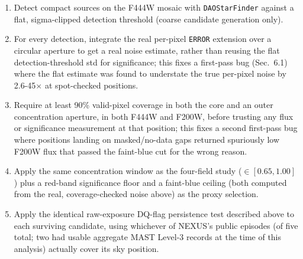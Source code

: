 \documentclass[11pt]{article}
\begin{document}
\begin{enumerate}
    \item Detect compact sources on the F444W mosaic with \texttt{DAOStarFinder}
    against a flat, sigma-clipped detection threshold (coarse candidate
    generation only).
    \item For every detection, integrate the real per-pixel \texttt{ERROR}
    extension over a circular aperture to get a real noise estimate, rather
    than reusing the flat detection-threshold std for significance; this fixes
    a first-pass bug (Sec.~6.1) where the flat estimate was found to
    understate the true per-pixel noise by 2.6-45$\times$ at spot-checked
    positions.
    \item Require at least 90\% valid-pixel coverage in both the core and an
    outer concentration aperture, in both F444W and F200W, before trusting any
    flux or significance measurement at that position; this fixes a second
    first-pass bug where positions landing on masked/no-data gaps returned
    spuriously low F200W flux that passed the faint-blue cut for the wrong
    reason.
    \item Apply the same concentration window as the four-field study
    ($\in[0.65,1.00]$) plus a red-band significance floor and a faint-blue
    ceiling (both computed from the real, coverage-checked noise above) as the
    proxy selection.
    \item Apply the identical raw-exposure DQ-flag persistence test described
    above to each surviving candidate, using whichever of NEXUS's public
    episodes (of five total; two had usable aggregate MAST Level-3 records
    at the time of this analysis) actually cover its sky position.
\end{enumerate}
\end{document}
